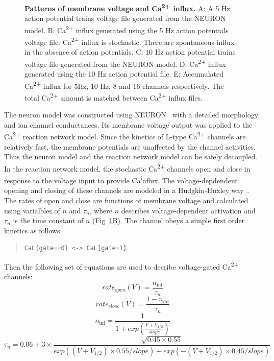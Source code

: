\documentclass[10pt,letterpaper]{article}
\begin{document}
\begin{figure}[!h]
	\caption{{\bf Patterns of membrane voltage and Ca\textsuperscript{2+} influx. }
	A: A 5 Hz action potential trains voltage file generated from the NEURON model. 
	B: Ca\textsuperscript{2+} influx generated using the 5 Hz action potentials voltage file. Ca\textsuperscript{2+} influx is stochastic. There are spontaneous influx in the absence of action potentials. 
	C: 10 Hz action potential trains voltage file generated from the NEURON model. 
	D: Ca\textsuperscript{2+} influx generated using the 10 Hz action potential file. 
	E: Accumulated Ca\textsuperscript{2+} influx for 5Hz, 10 Hz, 8 and 16 channels respectively. The total Ca\textsuperscript{2+} amount is matched between Ca\textsuperscript{2+} influx files.
	}
\label{fig15}
\end{figure}

The neuron model was constructed using NEURON~\cite{Carnevale:2006iv} with a detailed morphology and ion channel conductances. Its membrane voltage output was applied to the Ca\textsuperscript{2+} reaction network model. Since the kinetics of L-type Ca\textsuperscript{2+} channels are relatively fast, the membrane potentials are unaffected by the channel activities. Thus the neuron model and the reaction network model can be safely decoupled. In the reaction network model, the stochastic Ca\textsuperscript{2+} channels open and close in response to the voltage input to provide Ca\textsuperscript influx. The voltage-depdendent opening and closing of these channels are modeled in a Hudgkin-Huxley way~\cite{Tuckwell:2012tt}. The rates of open and close are functions of membrane voltage and calculated using varialbles of $n$ and $\tau_n$, where $n$ describes voltage-dependent activation and $\tau_n$ is the time constant of $n$ (Fig~\ref{fig15}B). The channel obeys a simple first order kinetics as follows.

\begin{quote}
 \verb|CaL{gate==0} <-> CaL[gate=1]|.
\end{quote}
Then the following set of equations are used to decribe voltage-gated Ca\textsuperscript{2+} channels:
\begin{equation}rate_{open}(V)=\frac{n_{\inf}}{\tau_n}\end{equation}
\begin{equation}rate_{close}(V)=\frac{1-n_{\inf}}{\tau_n}\end{equation}
\begin{equation}n_{\inf}=\frac{1}{1+exp(\frac{V+V_{1/2}}{slope})}\end{equation}
\begin{equation}\tau_n=0.06+3\times\frac{\sqrt{0.45\times0.55}}{exp((V+V_{1/2})\times0.55/slope)+exp(-(V+V_{1/2})\times0.45/slope)}\end{equation}
\end{document}
